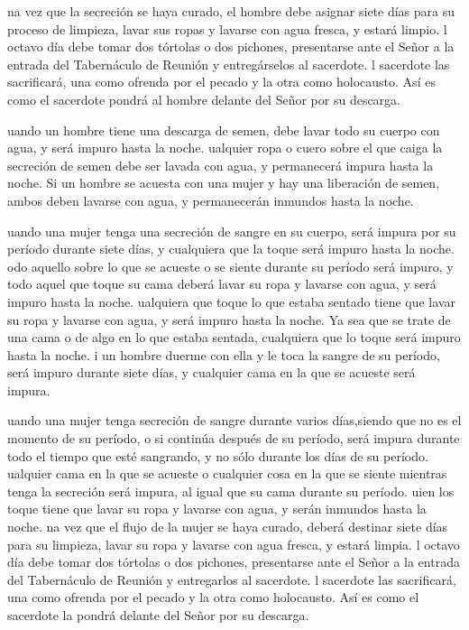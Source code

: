  na vez que la secreción se haya curado, el hombre debe
asignar siete días para su proceso de limpieza, lavar sus ropas y
lavarse con agua fresca, y estará limpio.  l octavo día
debe tomar dos tórtolas o dos pichones, presentarse ante el Señor a la
entrada del Tabernáculo de Reunión y entregárselos al sacerdote.
 l sacerdote las sacrificará, una como ofrenda por el
pecado y la otra como holocausto. Así es como el sacerdote pondrá al
hombre delante del Señor por su descarga.

 uando un hombre tiene una descarga de semen, debe lavar
todo su cuerpo con agua, y será impuro hasta la noche. 
ualquier ropa o cuero sobre el que caiga la secreción de semen debe ser
lavada con agua, y permanecerá impura hasta la noche.  Si
un hombre se acuesta con una mujer y hay una liberación de semen, ambos
deben lavarse con agua, y permanecerán inmundos hasta la noche.

 uando una mujer tenga una secreción de sangre en su
cuerpo, será impura por su período durante siete días, y cualquiera que
la toque será impuro hasta la noche.  odo aquello sobre lo
que se acueste o se siente durante su período será impuro, 
y todo aquel que toque su cama deberá lavar su ropa y lavarse con agua,
y será impuro hasta la noche.  ualquiera que toque lo que
estaba sentado tiene que lavar su ropa y lavarse con agua, y será impuro
hasta la noche.  Ya sea que se trate de una cama o de algo
en lo que estaba sentada, cualquiera que lo toque será impuro hasta la
noche.  i un hombre duerme con ella y le toca la sangre de
su período, será impuro durante siete días, y cualquier cama en la que
se acueste será impura.

 uando una mujer tenga secreción de sangre durante varios
días,siendo que no es el momento de su período, o si continúa después de
su período, será impura durante todo el tiempo que esté sangrando, y no
sólo durante los días de su período.  ualquier cama en la
que se acueste o cualquier cosa en la que se siente mientras tenga la
secreción será impura, al igual que su cama durante su período.
 uien los toque tiene que lavar su ropa y lavarse con agua,
y serán inmundos hasta la noche.  na vez que el flujo de la
mujer se haya curado, deberá destinar siete días para su limpieza, lavar
su ropa y lavarse con agua fresca, y estará limpia.  l
octavo día debe tomar dos tórtolas o dos pichones, presentarse ante el
Señor a la entrada del Tabernáculo de Reunión y entregarlos al
sacerdote.  l sacerdote las sacrificará, una como ofrenda
por el pecado y la otra como holocausto. Así es como el sacerdote la
pondrá delante del Señor por su descarga.


